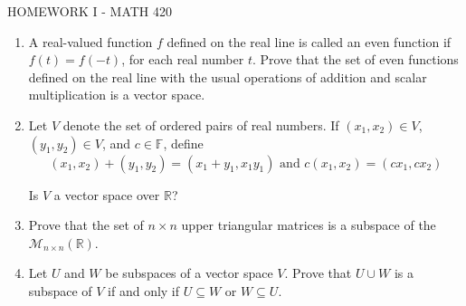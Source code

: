 \documentclass{article}
\begin{document}
\centerline{HOMEWORK I - MATH 420}
\begin{enumerate}
\item
A real-valued function $f$ defined on the real line is called an even function if $f(t)=f(-t)$, for each real number $t$. Prove that the set of even functions defined on the real line with the usual operations of addition and scalar multiplication is a vector space.

\item
Let $V$ denote the set of ordered pairs of real numbers. If $(x_1, x_2)\in V$, $(y_1, y_2)\in V$, and $c\in\mathbb{F}$, define
$$(x_1, x_2)+(y_1, y_2)=(x_1+y_1,x_1y_1) \mbox{ and } c(x_1, x_2)=(cx_1, cx_2)$$

Is $V$ a vector space over $\mathbb{R}$?
\item Prove that the set of $n\times n$ upper triangular matrices is a subspace of the $\mathcal{M}_{n\times n}(\mathbb{R})$.

 \item Let $U$ and $W$ be subspaces of a vector space $V$. Prove that $U\cup W$ is a subspace of $V$ if and only if $U\subseteq W$ or $W\subseteq U$.
     \end{enumerate}
     
\end{document}
